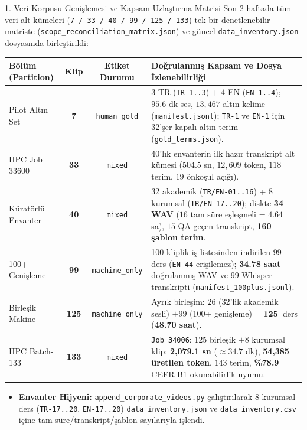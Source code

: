 \documentclass[aspectratio=169,10pt]{beamer}
\begin{document}
\begin{frame}{1. Veri Korpusu Genişlemesi ve Kapsam Uzlaştırma Matrisi}
\scriptsize
Son 2 haftada tüm veri alt kümeleri (\texttt{7 / 33 / 40 / 99 / 125 / 133}) tek bir denetlenebilir matriste (\texttt{scope\_reconciliation\_matrix.json}) ve güncel \texttt{data\_inventory.json} dosyasında birleştirildi:

\vspace{0.15cm}
\begin{table}
\centering
\scriptsize
\begin{tabular}{lccp{8.2cm}}
\toprule
\textbf{Bölüm (Partition)} & \textbf{Klip} & \textbf{Etiket Durumu} & \textbf{Doğrulanmış Kapsam ve Dosya İzlenebilirliği} \\
\midrule
Pilot Altın Set & \textbf{7} & \texttt{human\_gold} & 3 TR (\texttt{TR-1..3}) + 4 EN (\texttt{EN-1..4}); $95.6$ dk ses, $13{,}467$ altın kelime (\texttt{manifest.jsonl}); \texttt{TR-1} ve \texttt{EN-1} için 32'şer kapalı altın terim (\texttt{gold\_terms.json}). \\
HPC Job 33600 & \textbf{33} & \texttt{mixed} & 40'lık envanterin ilk hazır transkript alt kümesi ($504.5$ sn, $12{,}609$ token, $118$ terim, $19$ önkoşul açığı). \\
Küratörlü Envanter & \textbf{40} & \texttt{mixed} & 32 akademik (\texttt{TR/EN-01..16}) + 8 kurumsal (\texttt{TR/EN-17..20}); diskte \textbf{34 WAV} ($16$ tam süre eşleşmeli = $4.64$ sa), $15$ QA-geçen transkript, \textbf{160 şablon terim}. \\
100+ Genişleme & \textbf{99} & \texttt{machine\_only} & 100 kliplik iş listesinden indirilen 99 ders (\texttt{EN-44} erişilemez); \textbf{34.78 saat} doğrulanmış WAV ve 99 Whisper transkripti (\texttt{manifest\_100plus.jsonl}). \\
Birleşik Makine & \textbf{125} & \texttt{machine\_only} & Ayrık birleşim: $26$ (32'lik akademik sesli) $+ 99$ (100+ genişleme) $= \textbf{125}$ ders (\textbf{48.70 saat}). \\
HPC Batch-133 & \textbf{133} & \texttt{mixed} & \texttt{Job 34006}: $125$ birleşik $+ 8$ kurumsal klip; \textbf{2{,}079.1 sn} ($\approx 34.7$ dk), \textbf{54{,}385 üretilen token}, $143$ terim, \textbf{\%78.9} CEFR B1 okunabilirlik uyumu. \\
\bottomrule
\end{tabular}
\end{table}

\begin{itemize}
    \item \textbf{Envanter Hijyeni:} \texttt{append\_corporate\_videos.py} çalıştırılarak 8 kurumsal ders (\texttt{TR-17..20}, \texttt{EN-17..20}) \texttt{data\_inventory.json} ve \texttt{data\_inventory.csv} içine tam süre/transkript/şablon sayılarıyla işlendi.
\end{itemize}
\end{frame}
\end{document}
